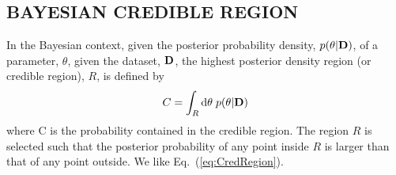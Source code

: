 

\begin{appendices}

\section{BAYESIAN CREDIBLE REGION}
\label{sec:CredRegion}

In the Bayesian context, given the posterior probability density,
$p(\theta|{\bf D})$, of a parameter, $\theta$, given the dataset,
${\bf D}$, the highest posterior density region (or credible
region), $R$, is defined by
\begin{equation}
C = \int\sb{R} {\rm d}\theta\;p(\theta|{\bf D})
\label{eq:CredRegion}
\end{equation}
where C is the probability contained in the credible region.  The
region $R$ is selected such that the posterior probability of any
point inside $R$ is larger than that of any point outside.  We like
Eq.\ (\ref{eq:CredRegion}).

\end{appendices}


